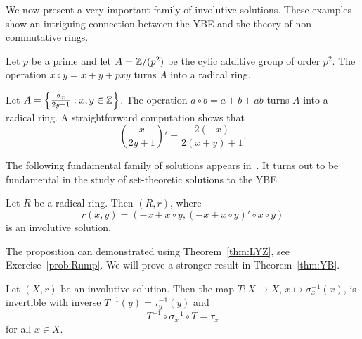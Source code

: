 We now present a very important family of involutive solutions. 
These examples show an intriguing connection between the YBE and the 
theory of non-commutative rings. 




\begin{example}
Let $p$ be a prime and let $A=\mathbb{Z}/(p^2)$ be the cylic additive group of order $p^2$. 
The operation $x\circ y=x+y+pxy$ 
turns $A$ into a radical ring. 
\end{example}

\begin{example}
Let $A=\left\{\frac{2x}{2y+1}:x,y\in\mathbb{Z}\right\}$. The operation 
$a\circ b=a+b+ab$ turns $A$ into a radical ring. A straightforward computation shows that 
\[
\left(\frac{x}{2y+1}\right)'=\frac{2(-x)}{2(x+y)+1}.
\]
\end{example}

The following fundamental family of solutions appears in~\cite{MR2278047}. 
It turns out to be fundamental in the study of 
set-theoretic solutions to the YBE. 

\begin{proposition}
\label{pro:Rump}
Let $R$ be a radical ring. Then $(R,r)$, where 
\[
r(x,y)=( -x+x\circ y,(-x+x\circ y)'\circ x\circ y)
\]
is an involutive solution.
\end{proposition}

The proposition can demonstrated using Theorem~\ref{thm:LYZ}, 
see Exercise~\ref{prob:Rump}. 
We will prove a stronger result in Theorem~\ref{thm:YB}. 

\begin{proposition}
\label{pro:T}
Let $(X,r)$ be an involutive solution. 
Then the map $T\colon X\to X$, $x\mapsto\sigma_x^{-1}(x)$, is 
invertible with inverse $T^{-1}(y)=\tau^{-1}_y(y)$ and 
\[
T^{-1}\circ\sigma_x^{-1}\circ T=\tau_x
\]
for all $x\in X$. 
\end{proposition}

